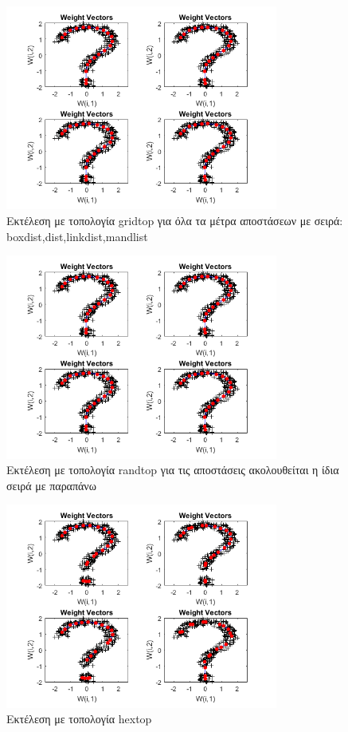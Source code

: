 \documentclass[12pt]{article}
\begin{document}
		\begin{figure}[H]
	 		\centering
			\includegraphics[width=0.8\textwidth]{fakelos/gridtop_question.png}
			\caption{Εκτέλεση με τοπολογία gridtop για όλα τα μέτρα αποστάσεων με σειρά: boxdist,dist,linkdist,mandlist} 	  
			\label{fig:2}
		\end{figure} 
		\begin{figure}[H]
	 		\centering
			\includegraphics[width=0.8\textwidth]{fakelos/hextop_question.png}
			\caption{Εκτέλεση με τοπολογία randtop για τις αποστάσεις ακολουθείται η ίδια σειρά με παραπάνω} 	  
			\label{fig:2}
		\end{figure} 		
		\begin{figure}[H]
	 		\centering
			\includegraphics[width=0.8\textwidth]{fakelos/randtop_question.png}
			\caption{Εκτέλεση με τοπολογία hextop} 	  
			\label{fig:2}
		\end{figure}
\end{document}
